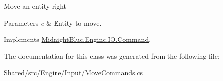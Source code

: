 Move an entity right 


\begin{DoxyParams}{Parameters}
{\em e} & Entity to move.\\
\hline
\end{DoxyParams}


Implements \hyperlink{class_midnight_blue_1_1_engine_1_1_i_o_1_1_command_ae641d2c1a9db17f03ee6b7854b00a9d2}{Midnight\+Blue.\+Engine.\+I\+O.\+Command}.



The documentation for this class was generated from the following file\+:\begin{DoxyCompactItemize}
\item 
Shared/src/\+Engine/\+Input/Move\+Commands.\+cs\end{DoxyCompactItemize}
